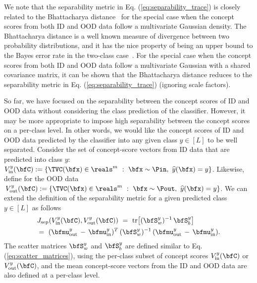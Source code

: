 
We note that the separability metric in Eq. (\ref{eq:separability_trace}) is closely related to the Bhattacharya distance~\cite{bhattacharyya1943measure} for the special case when the concept scores from both ID and OOD data follow a multivariate Gaussian density. The Bhattacharya distance is a well known measure of divergence between two probability distributions, and it has the nice property of being an upper bound to the Bayes error rate in the two-class case~\cite{fukunaga1990bhatta}. For the special case when the concept scores from both ID and OOD data follow a multivariate Gaussian with a shared covariance matrix, it can be shown that the Bhattacharya distance reduces to the separability metric in Eq. (\ref{eq:separability_trace}) (ignoring scale factors). 

So far, we have focused on the separability between the concept scores of ID and OOD data without considering the class prediction of the classifier.
However, it may be more appropriate to impose high separability between the concept scores on a per-class level. In other words, we would like the concept scores of ID and OOD data predicted by the classifier into any given class $y \in [L]$ to be well separated.
Consider the set of concept-score vectors from ID data that are predicted into class $y$: $V^{y}_{\textrm{in}}(\bfC) := \{\TVC(\bfx) \in \reals^m ~:~ \bfx \sim \Pin, ~\widehat{y}(\bfx) = y\}$. 
Likewise, define for the OOD data $\,V^{y}_{\textrm{out}}(\bfC) := \{\TVC(\bfx) \in \reals^m ~:~ \bfx \sim \Pout, ~\widehat{y}(\bfx) = y\}$. 
We can extend the definition of the separability metric for a given predicted class $y \in [L]$ as follows
\begin{align}
\label{eq:separability_trace_per_class}
&J_{\textrm{sep}}(V^{y}_{\textrm{in}}(\bfC), V^{y}_{\textrm{out}}(\bfC)) ~=~ \textrm{tr}\big[(\bfS^{y}_w)^{-1} \,\bfS^y_b\big] \nonumber \\
&=~ (\bfmu^y_{\textrm{out}} \,-\, \bfmu^y_{\textrm{in}})^T \,(\bfS^y_w)^{-1} \,(\bfmu^y_{\textrm{out}} \,-\, \bfmu^y_{\textrm{in}}).
\end{align}
The scatter matrices $\bfS^y_w$ and $\bfS^y_b$ are defined similar to Eq. (\ref{eq:scatter_matrices}), using the per-class subset of concept scores $V^{y}_{\textrm{in}}(\bfC)$ or $V^{y}_{\textrm{out}}(\bfC)$, and the mean concept-score vectors from the ID and OOD data are also defined at a per-class level.


